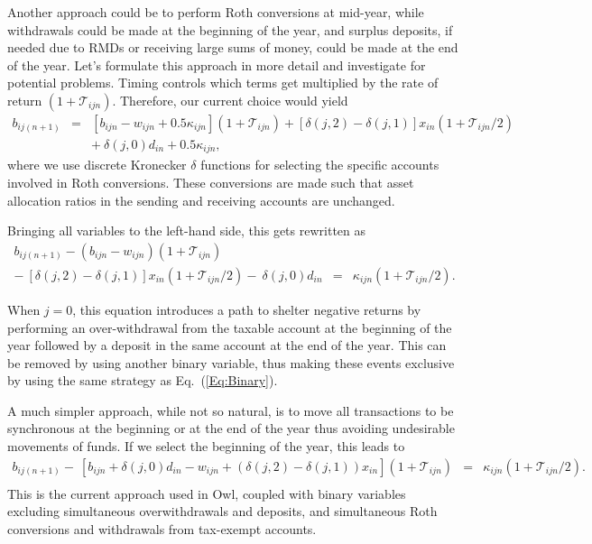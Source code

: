\documentclass{report}[fleqn,11pt]
\begin{document}
	Another approach could be to perform Roth conversions at mid-year, while withdrawals
	could be made at the beginning of the year, and surplus deposits,
	if needed due to RMDs or receiving large sums of money,
	could be made at the end of the year. Let's formulate this approach
	in more detail and investigate for potential problems.
	Timing controls which terms get multiplied by the rate of return $(1 + \mathcal{T}_{ijn})$.
	Therefore, our current choice would yield
	\begin{eqnarray}
		\label{Eq:C3a}
		b_{ij(n+1)} &=& [b_{ijn} - w_{ijn} + 0.5\kappa_{ijn}](1 + \mathcal{T}_{ijn})
		+ [\delta(j, 2) - \delta(j, 1)]x_{in} (1 + \mathcal{T}_{ijn}/2)
		\nonumber \\
		&& 
		+\ \delta(j, 0) d_{in} + 0.5 \kappa_{ijn},
	\end{eqnarray}
	where we use discrete Kronecker $\delta$ functions for selecting the specific accounts involved
	in Roth conversions. These conversions are made such that asset allocation
	ratios in the sending and receiving accounts are unchanged.

	Bringing all variables
	to the left-hand side, this gets rewritten as
	\begin{eqnarray}
		\label{Eq:C3}
		b_{ij(n+1)} - (b_{ijn} - w_{ijn}) (1 + \mathcal{T}_{ijn})
		&& \nonumber \\
		-\ [\delta(j, 2) - \delta(j, 1)]x_{in}(1 + \mathcal{T}_{ijn}/2)
		-\ \delta(j, 0) d_{in}
		&=& \kappa_{ijn} (1 + \mathcal{T}_{ijn}/2).
	\end{eqnarray}

	When $j=0$, this equation introduces
	a path to shelter negative returns by performing an over-withdrawal from the taxable
	account at the beginning of the year followed by a deposit in the
	same account at the end of the year. This can 
	be removed by using another binary variable, thus making these events exclusive by using
	the same strategy as Eq.~(\ref{Eq:Binary}).

	A much simpler approach, while not so natural,
	is to move all transactions to be synchronous at the beginning or at the end of the year
	thus avoiding undesirable movements of funds.
	If we select the beginning of the year, this leads to
	\begin{eqnarray}
		\label{Eq:C3b}
		b_{ij(n+1)}
		- \ [b_{ijn} + \delta(j, 0)d_{in} - w_{ijn} + (\delta(j, 2) - \delta(j, 1))x_{in}]
		(1 + \mathcal{T}_{ijn})
		&=& \kappa_{ijn} (1 + \mathcal{T}_{ijn}/2).
		\nonumber \\
	\end{eqnarray}
This is the current approach used in Owl, coupled with
binary variables excluding simultaneous overwithdrawals and deposits, and
simultaneous Roth conversions and withdrawals from tax-exempt accounts.
\end{document}
